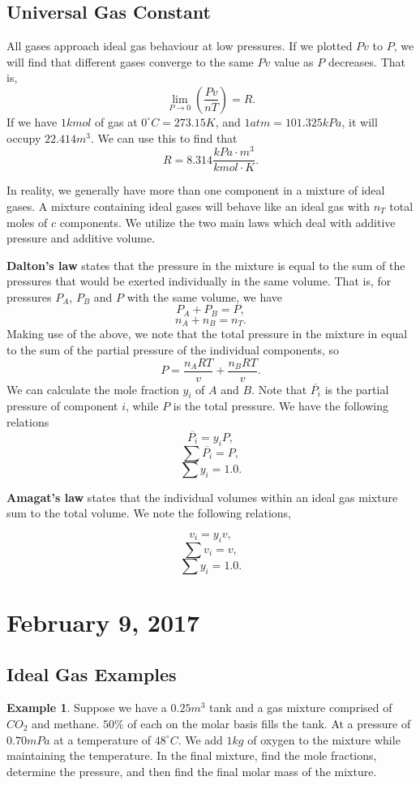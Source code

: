 \documentclass[11pt]{article}
\theoremstyle{plain} %
\theoremstyle{definition}
\theoremstyle{example}
\newtheorem*{example}{Example}
\theoremstyle{remark}
\begin{document}
\subsection{Universal Gas Constant}
All gases approach ideal gas behaviour at low pressures. If we plotted $Pv$ to $P$, we will find that different gases converge to the same $Pv$ value as $P$ decreases. That is,
$$\lim_{P \to 0}\left(\frac{Pv}{nT}\right) = R.$$
If we have $1kmol$ of gas at $0^{\circ}C = 273.15K$, and $1atm = 101.325kPa$, it will occupy $22.414m^3$. We can use this to find that 
$$R = 8.314\frac{kPa\cdot m^3}{kmol\cdot K}.$$

In reality, we generally have more than one component in a mixture of ideal gases. A mixture containing ideal gases will behave like an ideal gas with $n_T$ total moles of $c$ components. 
We utilize the two main laws which deal with additive pressure and additive volume.

\textbf{Dalton's law} states that the pressure in the mixture is equal to the sum of the pressures that would be exerted individually in the same volume. That is, for pressures $P_A$, $P_B$ and $P$ with the same volume, we have 
$$P_A + P_B = P,$$
$$n_A + n_B = n_T.$$
Making use of the above, we note that the total pressure in the mixture in equal to the sum of the partial pressure of the individual components, so
$$P = \frac{n_ART}{v}+\frac{n_BRT}{v}.$$
We can calculate the mole fraction $y_i$ of $A$ and $B$. Note that $\overline{P_i}$ is the partial pressure of component $i$, while $P$ is the total pressure. We have the following relations
$$\overline{P_i} = y_iP,$$
$$\sum \overline{P_i} = P,$$
$$\sum y_i = 1.0.$$

\textbf{Amagat's law} states that the individual volumes within an ideal gas mixture sum to the total volume. We note the following relations,

$$v_i = y_iv,$$
$$ \sum v_i =v,$$
$$\sum y_i = 1.0.$$

\section{February 9, 2017}
\subsection{Ideal Gas Examples}

\begin{example}
Suppose we have a $0.25m^3$ tank and a gas mixture comprised of $CO_2$ and methane. $50\%$ of each on the molar basis fills the tank. At a pressure of $0.70mPa$ at a temperature of $48^{\circ}C$. We add $1kg$ of oxygen to the mixture while maintaining the temperature. In the final mixture, find the mole fractions, determine the pressure, and then find the final molar mass of the mixture.
\end{example}
\end{document}

